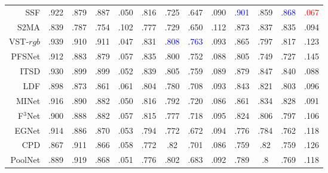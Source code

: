 \begin{table}[!ht]
{\begin{tabular}{rcccccccccccc}
			SSF     \cite{zhang2020select} 
			& .922 & .879 & .887 & .050 
			& .816 & .725 & .647 & .090 
			& \textcolor{blue}{.901} & .859 & \textcolor{blue}{.868} & {\textcolor{red}{.067}} \\ 
			
			S2MA    \cite{liu2020learning} 
			& .839 & .787 & .754 & 	.102 
			& .777 & .729 & .650 & .112 
			& .873 & .837 &	.835 & .094 \\
			
			
			\midrule[1pt] 
			
			
			VST-$rgb$ \cite{liu2021visual} 
			& .939 & .910 & .911 & .047
			& .831 & \textcolor{blue}{.808} & \textcolor{blue}{.763} & .093 
			& .865 & .797 & .817 & .123 
			\\ 
			
			PFSNet \cite{ma2021pyramidal}
			& .912 & .883 & .879 & .057 
			& .835 & .800 & .752 & .088 
			& .805 & .749 & .727 & .145 
			\\ 
			
			
			ITSD \cite{zhou2020interactive} 
			& .930 & .899 & .899 & .052 
			& .839 & .805 & .759 & .089 
			& .879 & .847 & .840 & .088 
			\\ 
			
			
			
			LDF \cite{wei2020label} 
			& .898 & .873 & .861 & .061 
			& .804 & .780 & .708 & .093 
			& .843 & .821 & .803 & .096 
			\\ 
			
			
			MINet \cite{pang2020multi} 
			& .916 & .890 & .882 & .050 
			& .816 & .792 & .720 & .086 
			& .861 & .834 & .828 & .091 
			\\ 
			
			F$^{3}$Net  \cite{wei2020f3net}
			& .900 & .888 & .882 & .057 
			& .815 & .777 & .718 & .095 
			& .824 & .806 & .797 & .106 
			\\ 
			
			
			EGNet   \cite{zhao2019egnet}
			& .914 & .886 & .870 & .053 
			& .794 & .772 & .672 & .094 
			& .776 & .784 & .762 & .118 
			\\ 
			
			CPD  \cite{wu2019cascaded}
			& .867 & .911 & .866 & .058 
			& .772 & .82  & .701 & .086 
			& .759 & .82  & .759 & .126 \\
			
			PoolNet \cite{liu2019simple}
			& .889 & .919 & .868 & .051 
			& .776 & .802 & .683 & .092 
			& .789 & .8   & .769 & .118 \\
			

\end{tabular}}
\end{table}
